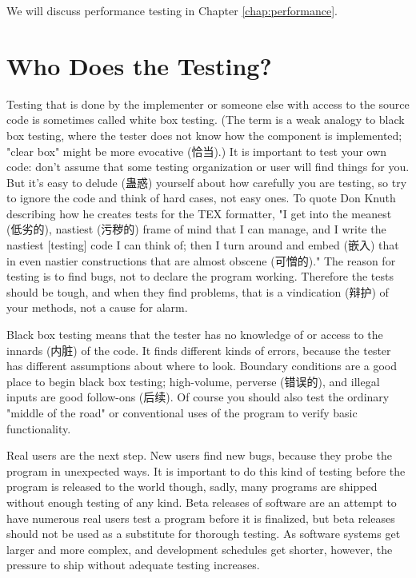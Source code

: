 We will discuss performance testing in Chapter \ref{chap:performance}.

\section{Who Does the Testing?}
\label{sec:who_does_the_testing}

Testing that is done by the implementer or someone else with access to the
source code is sometimes called white box testing. (The term is a weak
analogy to black box testing, where the tester does not know how the
component is implemented; "clear box" might be more evocative (恰当).) It
is important to test your own code: don't assume that some testing
organization or user will find things for you. But it's easy to delude
(蛊惑) yourself about how carefully you are testing, so try to ignore the
code and think of hard cases, not easy ones. To quote Don Knuth describing
how he creates tests for the TEX formatter, "I get into the meanest
(低劣的), nastiest (污秽的) frame of mind that I can manage, and I write
the nastiest [testing] code I can think of; then I turn around and embed
(嵌入) that in even nastier constructions that are almost obscene
(可憎的)." The reason for testing is to find bugs, not to declare the
program working. Therefore the tests should be tough, and when they find
problems, that is a vindication (辩护) of your methods, not a cause for
alarm.

Black box testing means that the tester has no knowledge of or access to
the innards (内脏) of the code. It finds different kinds of errors, because
the tester has different assumptions about where to look. Boundary
conditions are a good place to begin black box testing; high-volume,
perverse (错误的), and illegal inputs are good follow-ons (后续). Of course
you should also test the ordinary "middle of the road" or conventional uses
of the program to verify basic functionality.

Real users are the next step. New users find new bugs, because they probe
the program in unexpected ways. It is important to do this kind of testing
before the program is released to the world though, sadly, many programs
are shipped without enough testing of any kind. Beta releases of software
are an attempt to have numerous real users test a program before it is
finalized, but beta releases should not be used as a substitute for
thorough testing. As software systems get larger and more complex, and
development schedules get shorter, however, the pressure to ship without
adequate testing increases.

